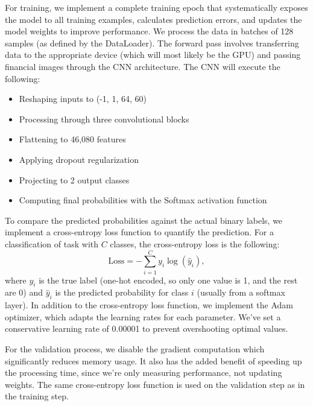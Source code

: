 \documentclass[12pt]{article}
\begin{document}
For training, we implement a complete training epoch that systematically exposes the model to all training examples, calculates prediction errors, and updates the model weights to improve performance. We process the data in batches of 128 samples (as defined by the DataLoader). The forward pass involves transferring data to the appropriate device (which will most likely be the GPU) and passing financial images through the CNN architecture. The CNN will execute the following:

\begin{itemize}
	\item Reshaping inputs to (-1, 1, 64, 60)
	\item Processing through three convolutional blocks
	\item Flattening to 46,080 features
	\item Applying dropout regularization
	\item Projecting to 2 output classes
	\item Computing final probabilities with the Softmax activation function
\end{itemize}
To compare the predicted probabilities against the actual binary labels, we implement a cross-entropy loss function to quantify the prediction. For a classification of task with $C$ classes, the cross-entropy loss is the following:
\begin{equation}
	\text{Loss}=-\sum_{i=1}^{C}y_i\log\left(\hat{y}_i\right),
\end{equation}
where $y_i$ is the true label (one-hot encoded, so only one value is 1, and the rest are 0) and $\hat{y}_i$ is the predicted probability for class $i$ (usually from a softmax layer). In addition to the cross-entropy loss function, we implement the Adam optimizer, which adapts the learning rates for each parameter. We've set a conservative learning rate of 0.00001 to prevent overshooting optimal values.

For the validation process, we disable the gradient computation which significantly reduces memory usage. It also has the added benefit of speeding up the processing time, since we're only measuring performance, not updating weights. The same cross-entropy loss function is used on the validation step as in the training step.
\end{document}
